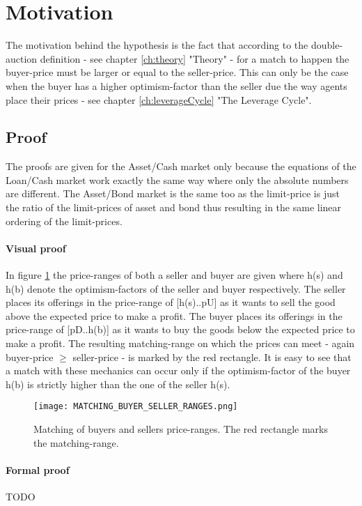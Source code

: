 \documentclass[Bachelorarbeit.tex]{subfiles}
\begin{document}
\section{Motivation}
The motivation behind the hypothesis is the fact that according to the double-auction definition - see chapter \ref{ch:theory} "Theory" - for a match to happen the buyer-price must be larger or equal to the seller-price. This can only be the case when the buyer has a higher optimism-factor than the seller due the way agents place their prices - see chapter \ref{ch:leverageCycle} "The Leverage Cycle".

\subsection{Proof}
The proofs are given for the Asset/Cash market only because the equations of the Loan/Cash market work exactly the same way where only the absolute numbers are different. The Asset/Bond market is the same too as the limit-price is just the ratio of the limit-prices of asset and bond thus resulting in the same linear ordering of the limit-prices.

\paragraph{Visual proof}
In figure \ref{fig:MATCHING_BUYER_SELLER_RANGES} the price-ranges of both a seller and buyer are given where h(s) and h(b) denote the optimism-factors of the seller and buyer respectively. The seller places its offerings in the price-range of [h(s)..pU] as it wants to sell the good above the expected price to make a profit. The buyer places its offerings in the price-range of [pD..h(b)] as it wants to buy the goods below the expected price to make a profit. The resulting matching-range on which the prices can meet - again buyer-price $\geq$ seller-price - is marked by the red rectangle. It is easy to see that a match with these mechanics can occur only if the optimism-factor of the buyer h(b) is strictly higher than the one of the seller h(s).

\begin{figure}[H]
	\centering
  \texttt{[image: MATCHING\_BUYER\_SELLER\_RANGES.png]}
  	\caption{Matching of buyers and sellers price-ranges. The red rectangle marks the matching-range.}
	\label{fig:MATCHING_BUYER_SELLER_RANGES}
\end{figure}

\paragraph{Formal proof}
TODO
\end{document}
